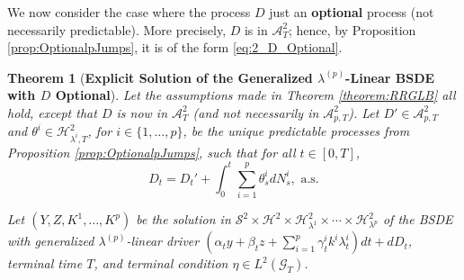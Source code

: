 \documentclass[11pt,a4paper]{article}
\numberwithin{equation}{section}
\theoremstyle{newPlain}
\newtheorem{theorem}{Theorem}[section]
\theoremstyle{newDefinition}
\theoremstyle{newRemark}
\begin{document}
{We now consider the case where the process $D$ just an \textbf{optional} process (not necessarily predictable). More precisely, $D$ is in $\mathcal{A}_{T}^2$; hence, by Proposition \ref{prop:OptionalpJumps}, it is of the form \eqref{eq:2_D_Optional}.

\begin{theorem}[\textbf{Explicit Solution of the Generalized $\lambda^{(p)}$-Linear BSDE with $D$ Optional}]\label{theorem:RRGLB2}
    Let the assumptions made in Theorem \ref{theorem:RRGLB} all hold, except that $D$ is now in $\mathcal{A}_T^2$ (and not necessarily in $\mathcal{A}_{p,T}^2$). Let $D'\in\mathcal{A}_{p,T}^2$ and $\theta^i\in\mathcal{H}_{\lambda^i,T}^2$, for $i\in\{1,\ldots,p\}$, be the unique predictable processes from Proposition \ref{prop:OptionalpJumps}, such that for all $t\in[0,T]$,
    \begin{equation}\label{eq:ThmDOptRR1}
        D_t = D_t' + \int_0^t\sum_{i=1}^p\theta_s^idN_s^i, \text{  a.s.}
    \end{equation}

    Let $(Y,Z,K^1,\ldots,K^p)$ be the solution in $\mathcal{S}^2\times\mathcal{H}^2\times\mathcal{H}_{\lambda^1}^2\times\cdots\times\mathcal{H}_{\lambda^p}^2$ of the BSDE  with generalized $\lambda^{(p)}$-linear driver $(\alpha_ty+\beta_tz+\sum_{i=1}^p\gamma_t^ik^i\lambda_t^i)dt + dD_t$, terminal time $T$, and terminal condition $\eta\in L^2({\mathcal{G}_T})$.


\end{theorem}}
\end{document}
